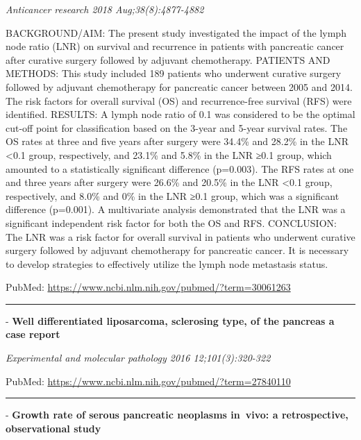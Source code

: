 \documentclass[]{article}
\begin{document}
\emph{Anticancer research 2018 Aug;38(8):4877-4882}

BACKGROUND/AIM: The present study investigated the impact of the lymph
node ratio (LNR) on survival and recurrence in patients with pancreatic
cancer after curative surgery followed by adjuvant chemotherapy.
PATIENTS AND METHODS: This study included 189 patients who underwent
curative surgery followed by adjuvant chemotherapy for pancreatic cancer
between 2005 and 2014. The risk factors for overall survival (OS) and
recurrence-free survival (RFS) were identified. RESULTS: A lymph node
ratio of 0.1 was considered to be the optimal cut-off point for
classification based on the 3-year and 5-year survival rates. The OS
rates at three and five years after surgery were 34.4\% and 28.2\% in
the LNR \textless{}0.1 group, respectively, and 23.1\% and 5.8\% in the
LNR ≥0.1 group, which amounted to a statistically significant difference
(p=0.003). The RFS rates at one and three years after surgery were
26.6\% and 20.5\% in the LNR \textless{}0.1 group, respectively, and
8.0\% and 0\% in the LNR ≥0.1 group, which was a significant difference
(p=0.001). A multivariate analysis demonstrated that the LNR was a
significant independent risk factor for both the OS and RFS. CONCLUSION:
The LNR was a risk factor for overall survival in patients who underwent
curative surgery followed by adjuvant chemotherapy for pancreatic
cancer. It is necessary to develop strategies to effectively utilize the
lymph node metastasis status.

PubMed: \url{https://www.ncbi.nlm.nih.gov/pubmed/?term=30061263}

{}

{}

\begin{center}\rule{0.5\linewidth}{\linethickness}\end{center}

 - \textbf{Well differentiated liposarcoma, sclerosing type, of the
pancreas a case report}

\emph{Experimental and molecular pathology 2016 12;101(3):320-322}

PubMed: \url{https://www.ncbi.nlm.nih.gov/pubmed/?term=27840110}

{}

{}

\begin{center}\rule{0.5\linewidth}{\linethickness}\end{center}

 - \textbf{Growth rate of serous pancreatic neoplasms in~vivo: a
retrospective, observational study}
\end{document}
